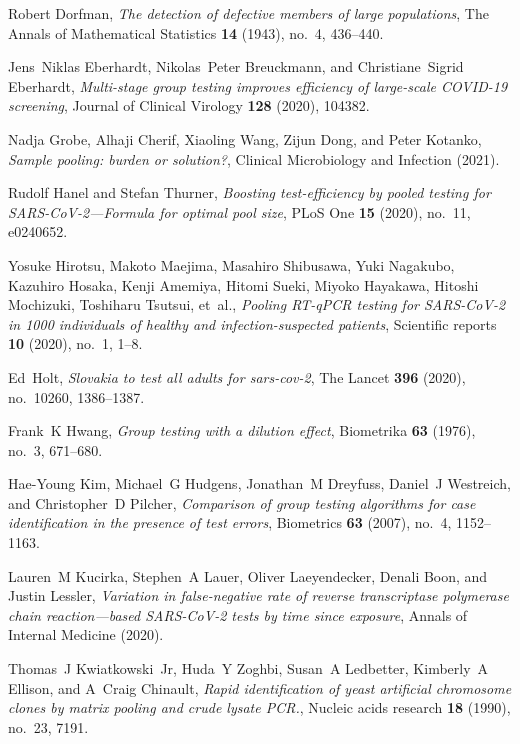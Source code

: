 \documentclass{article}
\begin{document}
\begin{thebibliography}{10}
Robert Dorfman, \emph{The detection of defective members of large populations},
  The Annals of Mathematical Statistics \textbf{14} (1943), no.~4, 436--440.

Jens~Niklas Eberhardt, Nikolas~Peter Breuckmann, and Christiane~Sigrid
  Eberhardt, \emph{Multi-stage group testing improves efficiency of large-scale
  {COVID}-19 screening}, Journal of Clinical Virology \textbf{128} (2020),
  104382.

Nadja Grobe, Alhaji Cherif, Xiaoling Wang, Zijun Dong, and Peter Kotanko,
  \emph{Sample pooling: burden or solution?}, Clinical Microbiology and
  Infection (2021).

Rudolf Hanel and Stefan Thurner, \emph{Boosting test-efficiency by pooled
  testing for {SARS-CoV}-2---{F}ormula for optimal pool size}, PLoS One
  \textbf{15} (2020), no.~11, e0240652.

Yosuke Hirotsu, Makoto Maejima, Masahiro Shibusawa, Yuki Nagakubo, Kazuhiro
  Hosaka, Kenji Amemiya, Hitomi Sueki, Miyoko Hayakawa, Hitoshi Mochizuki,
  Toshiharu Tsutsui, et~al., \emph{Pooling {RT-qPCR} testing for {SARS-CoV-2}
  in 1000 individuals of healthy and infection-suspected patients}, Scientific
  reports \textbf{10} (2020), no.~1, 1--8.

Ed~Holt, \emph{Slovakia to test all adults for sars-cov-2}, The Lancet
  \textbf{396} (2020), no.~10260, 1386--1387.

Frank~K Hwang, \emph{Group testing with a dilution effect}, Biometrika
  \textbf{63} (1976), no.~3, 671--680.

Hae-Young Kim, Michael~G Hudgens, Jonathan~M Dreyfuss, Daniel~J Westreich, and
  Christopher~D Pilcher, \emph{Comparison of group testing algorithms for case
  identification in the presence of test errors}, Biometrics \textbf{63}
  (2007), no.~4, 1152--1163.

Lauren~M Kucirka, Stephen~A Lauer, Oliver Laeyendecker, Denali Boon, and Justin
  Lessler, \emph{Variation in false-negative rate of reverse transcriptase
  polymerase chain reaction---based {SARS-CoV}-2 tests by time since exposure},
  Annals of Internal Medicine (2020).

Thomas~J Kwiatkowski~Jr, Huda~Y Zoghbi, Susan~A Ledbetter, Kimberly~A Ellison,
  and A~Craig Chinault, \emph{Rapid identification of yeast artificial
  chromosome clones by matrix pooling and crude lysate {PCR}.}, Nucleic acids
  research \textbf{18} (1990), no.~23, 7191.


\end{thebibliography}
\end{document}
